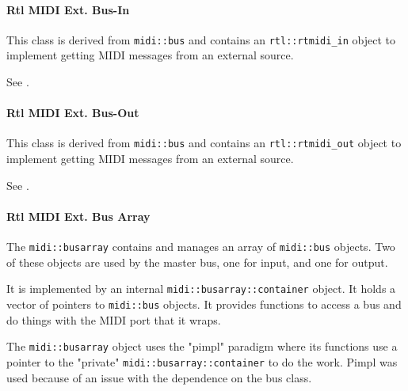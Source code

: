 
\paragraph{Rtl MIDI Ext. Bus-In}
\label{paragraph:rtl_midi_extensions_bus_in}

   This class is derived from \texttt{midi::bus} and
   contains an \texttt{rtl::rtmidi\_in} object to implement
   getting MIDI messages from an external source.

   See .

\paragraph{Rtl MIDI Ext. Bus-Out}
\label{paragraph:rtl_midi_extensions_bus_out}

   This class is derived from \texttt{midi::bus} and
   contains an \texttt{rtl::rtmidi\_out} object to implement
   getting MIDI messages from an external source.

   See .

\paragraph{Rtl MIDI Ext. Bus Array}
\label{paragraph:rtl_midi_extensions_bus_array}

   The \texttt{midi::busarray} contains and manages an array of
   \texttt{midi::bus} objects.  Two of these objects are used by
   the master bus,
   one for input, and one for output.

   It is implemented by an internal \texttt{midi::busarray::container}
   object. It holds a vector of pointers to \texttt{midi::bus} objects.
   It provides functions to access a bus and do things with the MIDI
   port that it wraps.

   The \texttt{midi::busarray} object uses the "pimpl" paradigm
   \cite{pimpl}
   where its functions use a pointer to the "private"
   \texttt{midi::busarray::container} to do the work.
   Pimpl was used because of an issue with the dependence on the bus class.

